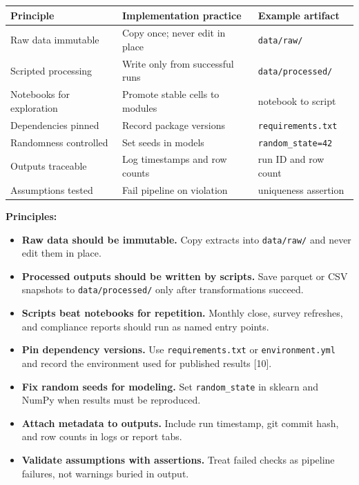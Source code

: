 \documentclass[
  12pt,
]{article}
\newcounter{none} %
\providecommand{\tightlist}{%
  \setlength{\itemsep}{0pt}\setlength{\parskip}{0pt}}
\begin{document}
{\def\LTcaptype{none} %
\begin{longtable}[]{@{}
  >{\raggedright\arraybackslash}p{}
  >{\raggedright\arraybackslash}p{}
  >{\raggedright\arraybackslash}p{}@{}}
\toprule\noalign{}
\begin{minipage}[b]{\linewidth}\raggedright
Principle
\end{minipage} & \begin{minipage}[b]{\linewidth}\raggedright
Implementation practice
\end{minipage} & \begin{minipage}[b]{\linewidth}\raggedright
Example artifact
\end{minipage} \\
\midrule\noalign{}
\endhead
\bottomrule\noalign{}
\endlastfoot
Raw data immutable & Copy once; never edit in place &
\texttt{data/raw/} \\
Scripted processing & Write only from successful runs &
\texttt{data/processed/} \\
Notebooks for exploration & Promote stable cells to modules & notebook
to script \\
Dependencies pinned & Record package versions &
\texttt{requirements.txt} \\
Randomness controlled & Set seeds in models &
\texttt{random\_state=42} \\
Outputs traceable & Log timestamps and row counts & run ID and row
count \\
Assumptions tested & Fail pipeline on violation & uniqueness
assertion \\
\end{longtable}
}

\textbf{Principles:}

\begin{itemize}
\tightlist
\item
  \textbf{Raw data should be immutable.} Copy extracts into
  \texttt{data/raw/} and never edit them in place.
\item
  \textbf{Processed outputs should be written by scripts.} Save parquet
  or CSV snapshots to \texttt{data/processed/} only after
  transformations succeed.
\item
  \textbf{Scripts beat notebooks for repetition.} Monthly close, survey
  refreshes, and compliance reports should run as named entry points.
\item
  \textbf{Pin dependency versions.} Use \texttt{requirements.txt} or
  \texttt{environment.yml} and record the environment used for published
  results {[}10{]}.
\item
  \textbf{Fix random seeds for modeling.} Set \texttt{random\_state} in
  sklearn and NumPy when results must be reproduced.
\item
  \textbf{Attach metadata to outputs.} Include run timestamp, git commit
  hash, and row counts in logs or report tabs.
\item
  \textbf{Validate assumptions with assertions.} Treat failed checks as
  pipeline failures, not warnings buried in output.
\end{itemize}
\end{document}
